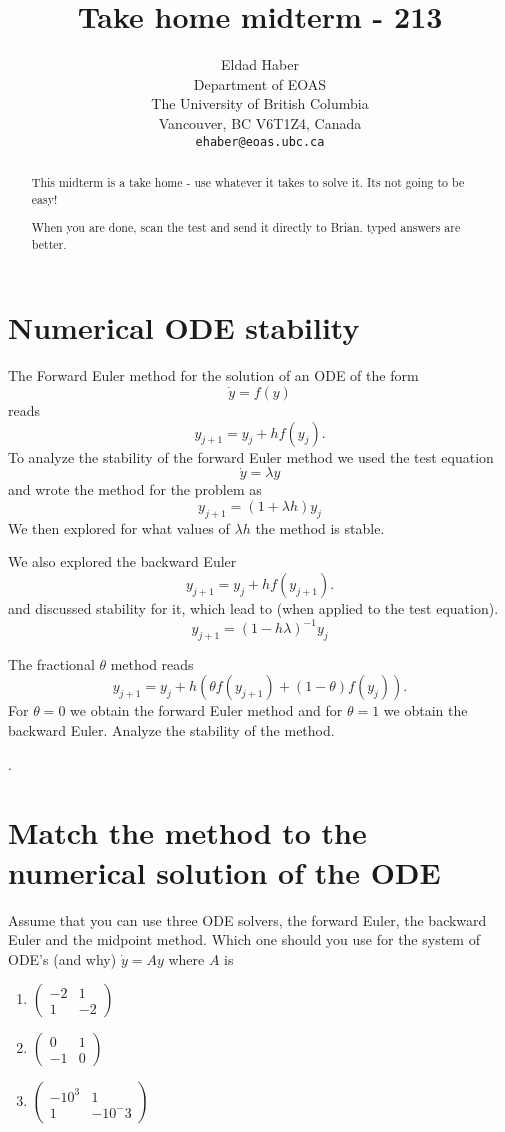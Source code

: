 \documentclass{article} %
\title{Take home midterm - 213  }
\author{Eldad Haber\\
Department of EOAS\\
The University of British Columbia\\
Vancouver, BC V6T1Z4, Canada \\
\texttt{ehaber@eoas.ubc.ca} 
}
\begin{document}
\maketitle


\begin{abstract}
This midterm is a take home - use whatever it takes to solve it. Its not going to be easy!


When you are done, scan the test and send it directly to Brian. typed answers are better.
\end{abstract}

\section{Numerical ODE stability}	

The Forward Euler method for the solution of an ODE of the form
$$ \dot{y} = f(y)$$
reads
$$ y_{j+1} = y_j + hf(y_j). $$
To analyze the stability of the forward Euler method we used the test equation
$$ \dot{y} = \lambda y $$
and wrote the method for the problem as
$$ y_{j+1} = (1 + \lambda h) y_j $$
We then explored for what values of $\lambda h$ the method is stable.

We also explored the backward Euler 
$$ y_{j+1} = y_j + hf(y_{j+1}). $$
and discussed stability for it, which lead to (when applied to the test equation).
$$ y_{j+1} = (1-h\lambda)^{-1} y_j $$

\bigskip

The fractional $\theta$ method reads
$$ y_{j+1} = y_j + h\left(\theta f(y_{j+1}) + (1-\theta) f(y_{j}) \right). $$
For $\theta=0$ we obtain the forward Euler method and for $\theta=1$ we obtain
the backward Euler.
Analyze the stability of the method.

\newpage 
.

\newpage

\section{Match the method to the numerical solution of the ODE}

Assume that you can use three ODE solvers, the forward Euler, the backward Euler and
the midpoint method. Which one should you use for the system of ODE's (and why)
$ \dot{y} = Ay$ where $A$ is 
\begin{enumerate}
\item $ \begin{pmatrix} -2 & 1 \\ 1 & -2 \end{pmatrix} $
\item $ \begin{pmatrix} 0 & 1 \\ -1 & 0 \end{pmatrix} $
\item $ \begin{pmatrix} -10^3 & 1 \\ 1 & -10^-3 \end{pmatrix} $
\end{enumerate}
\end{document}
